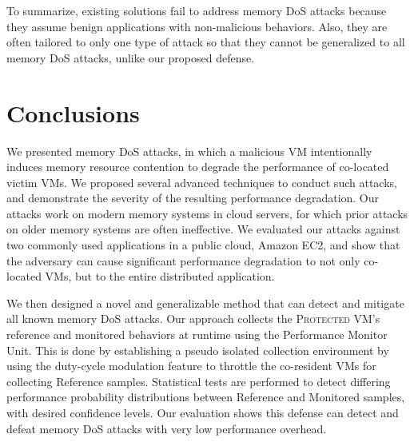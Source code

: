 \documentclass{sig-alternate}
\newcommand{\attackname}{memory DoS attacks\xspace}
\newcommand{\protectedVM}{\textsc{Protected VM}\xspace}
\begin{document}
To summarize, existing solutions fail to address \attackname because they assume
benign applications with non-malicious behaviors.  Also, they are often tailored
to only one type of attack so that they cannot be generalized to all memory DoS
attacks, unlike our proposed defense.


\section{Conclusions}
\label{sec:conclusion}


We presented \attackname, in which a malicious VM intentionally
induces memory resource contention to degrade the performance of co-located 
victim VMs. We proposed several advanced techniques to conduct such attacks,
and demonstrate the severity of the resulting performance
degradation. Our attacks work on modern memory systems in cloud servers, for which prior attacks on older memory systems are often ineffective.
We evaluated our attacks against two commonly used applications in
a public cloud, Amazon EC2, and show that the adversary can cause
significant performance degradation to not only co-located VMs, but to the entire
distributed application. 







We then designed a novel and generalizable method that can detect and mitigate
all known \attackname. Our approach collects the \protectedVM's reference and 
monitored behaviors at runtime using the Performance Monitor Unit. This is done by 
establishing a pseudo isolated collection environment by using the duty-cycle 
modulation feature to throttle the co-resident VMs for collecting Reference samples. Statistical tests are performed 
to detect differing performance probability distributions between Reference and Monitored samples, with desired confidence 
levels. Our evaluation shows this defense can detect and defeat \attackname with 
very low performance overhead.  










\end{document}
